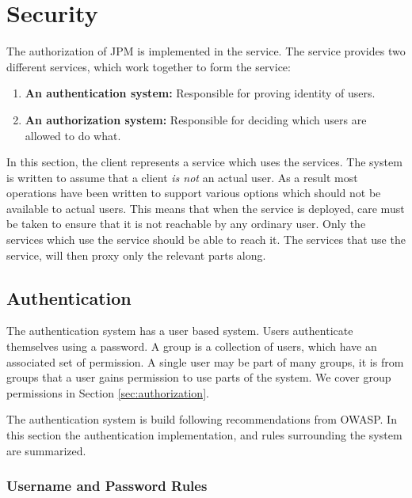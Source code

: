 \section{Security}
\label{sec:security}

The authorization of JPM is implemented in the \security service. The \security
service provides two different services, which work together to form the
\security service:

\begin{enumerate}

    \item \textbf{An authentication system:} Responsible for proving identity
        of users.

    \item \textbf{An authorization system:} Responsible for deciding which
        users are allowed to do what.

\end{enumerate}

In this section, the client represents a service which uses the \security
services. The system is written to assume that a client \emph{is not} an actual
user. As a result most operations have been written to support various options
which should not be available to actual users. This means that when the
\security service is deployed, care must be taken to ensure that it is not
reachable by any ordinary user. Only the services which use the \security
service should be able to reach it. The services that use the \security
service, will then proxy only the relevant parts along.

\subsection{Authentication}
\label{sec:authentication}

The authentication system has a user based system. Users authenticate
themselves using a password. A group is a collection of users, which have an
associated set of permission. A single user may be part of many groups, it is
from groups that a user gains permission to use parts of the system. We cover
group permissions in Section \ref{sec:authorization}.

The authentication system is build following recommendations from
OWASP\autocite{OWASP1,OWASP2,OWASP3}. In this section the
authentication implementation, and rules surrounding the system are summarized.

\subsubsection*{Username and Password Rules}

